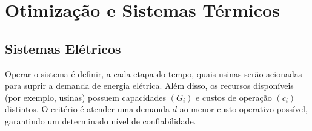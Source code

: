\section{Otimização e Sistemas Térmicos}
\label{sec:4}

\subsection{Sistemas Elétricos}
Operar o sistema é definir, a cada etapa do tempo, quais usinas serão acionadas para suprir a demanda de energia elétrica. Além disso, os
recursos disponíveis (por exemplo, usinas) possuem capacidades $(G_{i})$ e custos de operação $(c_{i})$ distintos. O critério é atender uma demanda $d$ ao menor custo operativo possível, garantindo um determinado nível de confiabilidade. 

